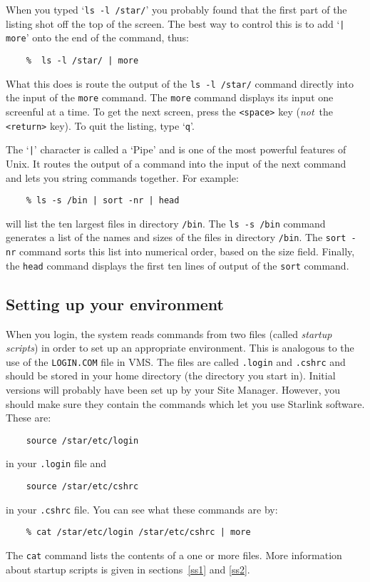 When you typed `{\tt ls -l /star/}' you probably found that the first part of
the listing shot off the top of the screen.
The best way to control this is to add `{\tt | more}' onto the end of the
command, thus:
\begin{verbatim}
    %  ls -l /star/ | more
\end{verbatim}
What this does is route the output of the {\tt ls -l /star/} command directly
into the input of the {\tt more} command.
The {\tt more} command displays its input one screenful at a time.
To get the next screen, press the {\tt <space>} key ({\em not}\, the
{\tt <return>} key).
To quit the listing, type `{\tt q}'.

The `{\tt |}' character is called a `Pipe' and is one of the most powerful
features of Unix.
It routes the output of a command into the input of the next command and lets
you string commands together.
For example:
\begin{verbatim}
    % ls -s /bin | sort -nr | head
\end{verbatim}
will list the ten largest files in directory {\tt /bin}.
The {\tt ls -s /bin} command generates a list of the names and sizes of the
files in directory {\tt /bin}.
The {\tt sort -nr} command sorts this list into numerical order, based on
the size field.
Finally, the {\tt head} command displays the first ten lines of output of
the {\tt sort} command.

\subsection{Setting up your environment}
\label{suye}

When you login, the system reads commands from two files (called {\em startup
scripts}) in order to set up an appropriate environment.
This is analogous to the use of the {\tt LOGIN.COM} file in VMS.
The files are called {\tt .login} and {\tt .cshrc} and should be stored in your
home directory (the directory you start in).
Initial versions will probably have been set up by your Site Manager.
However, you should make sure they contain the commands which let you use
Starlink software.
These are:
\begin{verbatim}
    source /star/etc/login
\end{verbatim}
in your {\tt .login} file and
\begin{verbatim}
    source /star/etc/cshrc
\end{verbatim}
in your {\tt .cshrc} file.
You can see what these commands are by:
\begin{verbatim}
    % cat /star/etc/login /star/etc/cshrc | more
\end{verbatim}
The {\tt cat} command lists the contents of a one or more files.
More information about startup scripts is given in sections~\ref{ss1} and
\ref{ss2}.


